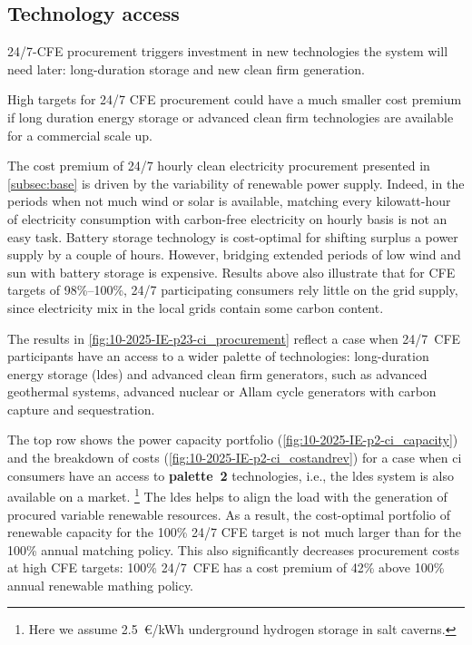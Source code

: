 \subsection{Technology access}
\label{subsec:palette}

\vspace{10pt}
\begin{res}
    24/7-CFE procurement triggers investment in new technologies the system will need later: long-duration storage and new clean firm generation.
\end{res}

\vspace*{5pt}
\begin{res}
    High targets for 24/7 CFE procurement could have a much smaller cost premium if long duration energy storage or advanced clean firm technologies are available for a commercial scale up.
\end{res}

The cost premium of 24/7 hourly clean electricity procurement presented in \cref{subsec:base} is driven by the variability of renewable power supply.
Indeed, in the periods when not much wind or solar is available, matching every kilowatt-hour of electricity consumption with carbon-free electricity on hourly basis is not an easy task.
Battery storage technology is cost-optimal for shifting surplus a power supply by a couple of hours. 
However, bridging extended periods of low wind and sun with battery storage is expensive.
Results above also illustrate that for CFE targets of 98\%--100\%, 24/7 participating consumers rely little on the grid supply, since electricity mix in the local grids contain some carbon content.

The results in \cref{fig:10-2025-IE-p23-ci_procurement} reflect a case when 24/7~CFE participants have an access to a wider palette of technologies: 
long-duration energy storage (\gls{ldes}) and advanced clean firm generators, such as advanced geothermal systems, advanced nuclear or Allam cycle generators with carbon capture and sequestration.

The top row shows the power capacity portfolio (\cref{fig:10-2025-IE-p2-ci_capacity}) and the breakdown of costs (\cref{fig:10-2025-IE-p2-ci_costandrev}) for a case when \gls{ci} consumers have an access to \textbf{palette~2} technologies, i.e., the \gls{ldes} system is also available on a market.%
\footnote{Here we assume 2.5~\euro/kWh underground hydrogen storage in salt caverns.}
The \gls{ldes} helps to align the load with the generation of procured variable renewable resources. 
As a result, the cost-optimal portfolio of renewable capacity for the 100\% 24/7 CFE target is not much larger than for the 100\% annual matching policy. 
This also significantly decreases procurement costs at high CFE targets: 100\% 24/7~CFE has a cost premium of 42\% above 100\% annual renewable mathing policy.


